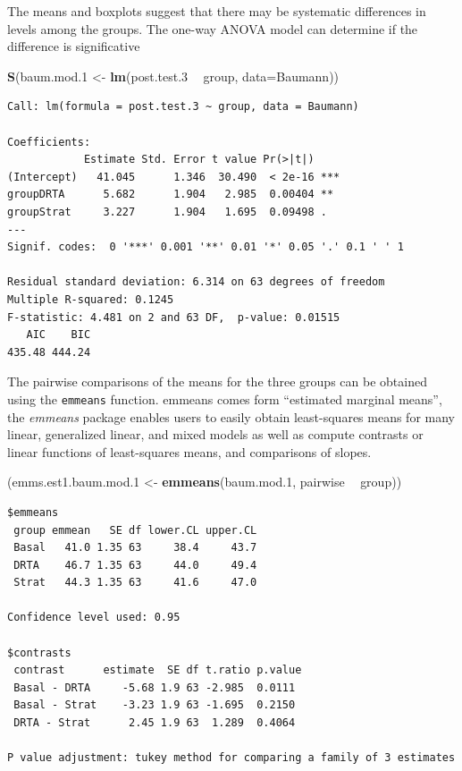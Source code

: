 \documentclass[
]{article}
\newenvironment{Shaded}{\begin{snugshade}}{\end{snugshade}}
\newcommand{\DataTypeTok}[1]{\textcolor[rgb]{0.13,0.29,0.53}{#1}}
\newcommand{\FloatTok}[1]{\textcolor[rgb]{0.00,0.00,0.81}{#1}}
\newcommand{\KeywordTok}[1]{\textcolor[rgb]{0.13,0.29,0.53}{\textbf{#1}}}
\newcommand{\NormalTok}[1]{#1}
\newcommand{\OperatorTok}[1]{\textcolor[rgb]{0.81,0.36,0.00}{\textbf{#1}}}
\newcommand{\StringTok}[1]{\textcolor[rgb]{0.31,0.60,0.02}{#1}}
\begin{document}
The means and boxplots suggest that there may be systematic differences
in levels among the groups. The one-way ANOVA model can determine if the
difference is significative

\begin{Shaded}
\begin{Highlighting}[]
\KeywordTok{S}\NormalTok{(baum.mod}\FloatTok{.1}\NormalTok{ <-}\StringTok{ }\KeywordTok{lm}\NormalTok{(post.test}\FloatTok{.3} \OperatorTok{~}\StringTok{ }\NormalTok{group, }\DataTypeTok{data=}\NormalTok{Baumann))}
\end{Highlighting}
\end{Shaded}

\begin{verbatim}
Call: lm(formula = post.test.3 ~ group, data = Baumann)

Coefficients:
            Estimate Std. Error t value Pr(>|t|)    
(Intercept)   41.045      1.346  30.490  < 2e-16 ***
groupDRTA      5.682      1.904   2.985  0.00404 ** 
groupStrat     3.227      1.904   1.695  0.09498 .  
---
Signif. codes:  0 '***' 0.001 '**' 0.01 '*' 0.05 '.' 0.1 ' ' 1

Residual standard deviation: 6.314 on 63 degrees of freedom
Multiple R-squared: 0.1245
F-statistic: 4.481 on 2 and 63 DF,  p-value: 0.01515 
   AIC    BIC 
435.48 444.24 
\end{verbatim}

The pairwise comparisons of the means for the three groups can be
obtained using the \texttt{emmeans} function. emmeans comes form
``estimated marginal means'', the \emph{emmeans} package enables users
to easily obtain least-squares means for many linear, generalized
linear, and mixed models as well as compute contrasts or linear
functions of least-squares means, and comparisons of slopes.

\begin{Shaded}
\begin{Highlighting}[]
\NormalTok{(emms.est1.baum.mod}\FloatTok{.1}\NormalTok{ <-}\StringTok{ }\KeywordTok{emmeans}\NormalTok{(baum.mod}\FloatTok{.1}\NormalTok{, pairwise }\OperatorTok{~}\StringTok{ }\NormalTok{group))}
\end{Highlighting}
\end{Shaded}

\begin{verbatim}
$emmeans
 group emmean   SE df lower.CL upper.CL
 Basal   41.0 1.35 63     38.4     43.7
 DRTA    46.7 1.35 63     44.0     49.4
 Strat   44.3 1.35 63     41.6     47.0

Confidence level used: 0.95 

$contrasts
 contrast      estimate  SE df t.ratio p.value
 Basal - DRTA     -5.68 1.9 63 -2.985  0.0111 
 Basal - Strat    -3.23 1.9 63 -1.695  0.2150 
 DRTA - Strat      2.45 1.9 63  1.289  0.4064 

P value adjustment: tukey method for comparing a family of 3 estimates 
\end{verbatim}
\end{document}
